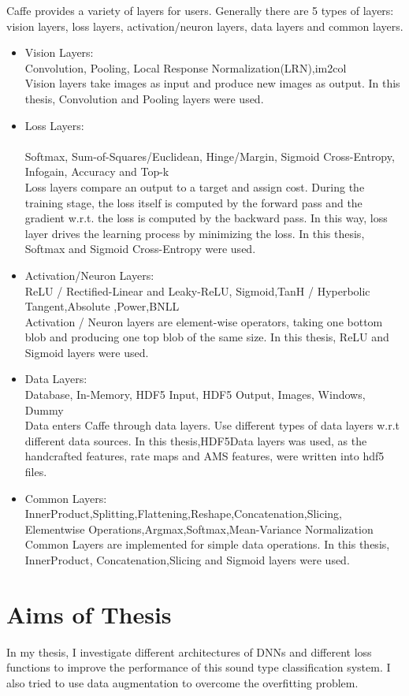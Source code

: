 Caffe provides a variety of layers for users. Generally there are 5 types of layers: vision layers, loss layers, activation/neuron layers, data layers and common layers.
\begin{itemize}
\item  Vision Layers:\\
Convolution, Pooling, Local Response Normalization(LRN),im2col\\
Vision layers  take images as input and produce new images as output. In this thesis, Convolution and Pooling layers were used.
\item Loss Layers:\\
\\Softmax, Sum-of-Squares/Euclidean, Hinge/Margin, Sigmoid Cross-Entropy, Infogain, Accuracy and Top-k\\
Loss layers compare an output to a target and assign cost. During the training stage, the loss itself is computed by the forward pass and the gradient w.r.t. the loss is computed by the backward pass. In this way, loss layer drives the learning process by minimizing the loss. In this thesis, Softmax and Sigmoid Cross-Entropy were used.

\item Activation/Neuron Layers:\\ 
ReLU / Rectified-Linear and Leaky-ReLU, Sigmoid,TanH / Hyperbolic Tangent,Absolute ,Power,BNLL\\
Activation / Neuron layers are element-wise operators, taking one bottom blob and producing one top blob of the same size. In this thesis, ReLU and Sigmoid layers were used.
\item Data Layers:\\
Database, In-Memory, HDF5 Input, HDF5 Output, Images, Windows, Dummy\\
Data enters Caffe through data layers.  Use different types of data layers w.r.t different data sources. In this thesis,HDF5Data layers was used, as the handcrafted features, rate maps and AMS features, were written into hdf5 files.
\item Common Layers:\\
InnerProduct,Splitting,Flattening,Reshape,Concatenation,Slicing, Elementwise Operations,Argmax,Softmax,Mean-Variance Normalization
\\
Common Layers are implemented for simple data operations.
In this thesis, InnerProduct, Concatenation,Slicing and Sigmoid layers were used.
\end{itemize}


\section{Aims of Thesis}
In my thesis, I investigate different architectures of DNNs and different loss functions to improve the  performance of this sound type classification system. I also tried to use data augmentation to overcome the overfitting problem.
